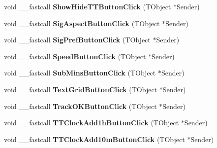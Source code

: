 \begin{DoxyCompactItemize}
\item 
\mbox{\label{class_t_interface_ac53166b064fa3b3e1180ff50c51be74b}} 
void \+\_\+\+\_\+fastcall {\bfseries Show\+Hide\+T\+T\+Button\+Click} (T\+Object $\ast$Sender)
\item 
\mbox{\label{class_t_interface_ac1e9ee3443ac91e2687e6f154d15521a}} 
void \+\_\+\+\_\+fastcall {\bfseries Sig\+Aspect\+Button\+Click} (T\+Object $\ast$Sender)
\item 
\mbox{\label{class_t_interface_a0242a91e5add0fc16e67b9e3f6a22898}} 
void \+\_\+\+\_\+fastcall {\bfseries Sig\+Pref\+Button\+Click} (T\+Object $\ast$Sender)
\item 
\mbox{\label{class_t_interface_ab1487b7a54ebacf27d7b980c65723d18}} 
void \+\_\+\+\_\+fastcall {\bfseries Speed\+Button\+Click} (T\+Object $\ast$Sender)
\item 
\mbox{\label{class_t_interface_ad0934d754138e9d12f390d9c538448e1}} 
void \+\_\+\+\_\+fastcall {\bfseries Sub\+Mins\+Button\+Click} (T\+Object $\ast$Sender)
\item 
\mbox{\label{class_t_interface_a16d199b0196b6e058b60f92f7a6978aa}} 
void \+\_\+\+\_\+fastcall {\bfseries Text\+Grid\+Button\+Click} (T\+Object $\ast$Sender)
\item 
\mbox{\label{class_t_interface_aab42b12ff3ba43ad2f70994b5399dd90}} 
void \+\_\+\+\_\+fastcall {\bfseries Track\+O\+K\+Button\+Click} (T\+Object $\ast$Sender)
\item 
\mbox{\label{class_t_interface_af8dbf714b9dfe7f6df1c4fe4ad06655e}} 
void \+\_\+\+\_\+fastcall {\bfseries T\+T\+Clock\+Add1h\+Button\+Click} (T\+Object $\ast$Sender)
\item 
\mbox{\label{class_t_interface_a3590355ce00174b1351d857578f850c8}} 
void \+\_\+\+\_\+fastcall {\bfseries T\+T\+Clock\+Add10m\+Button\+Click} (T\+Object $\ast$Sender)
\item 
\mbox{\label{class_t_interface_ae46427a550c7fc7dc1000003063ccb0e}} 

\end{DoxyCompactItemize}
